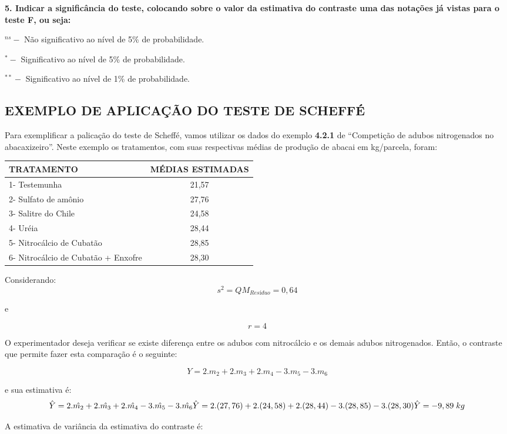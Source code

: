 \documentclass[
]{book}
\begin{document}
\textbf{5. Indicar a significância do teste, colocando sobre o valor da estimativa do contraste uma das notações já vistas para o teste F, ou seja:}

\(^{ns}-\) Não significativo ao nível de 5\% de probabilidade.

\(^{*}-\) Significativo ao nível de 5\% de probabilidade.

\(^{**}-\) Significativo ao nível de 1\% de probabilidade.

\hypertarget{exemplo-de-aplicauxe7uxe3o-do-teste-de-scheffuxe9}{%
\subsection{EXEMPLO DE APLICAÇÃO DO TESTE DE SCHEFFÉ}\label{exemplo-de-aplicauxe7uxe3o-do-teste-de-scheffuxe9}}

Para exemplificar a palicação do teste de Scheffé, vamos utilizar os dados do exemplo \textbf{4.2.1} de ``Competição de adubos nitrogenados no abacaxizeiro''. Neste exemplo os tratamentos, com suas respectivas médias de produção de abacai em kg/parcela, foram:

\begin{longtable}[]{@{}lc@{}}
\toprule
TRATAMENTO & MÉDIAS ESTIMADAS\tabularnewline
\midrule
\endhead
1- Testemunha & 21,57\tabularnewline
2- Sulfato de amônio & 27,76\tabularnewline
3- Salitre do Chile & 24,58\tabularnewline
4- Uréia & 28,44\tabularnewline
5- Nitrocálcio de Cubatão & 28,85\tabularnewline
6- Nitrocálcio de Cubatão + Enxofre & 28,30\tabularnewline
\bottomrule
\end{longtable}

Considerando:
\[
s^2 = QM_{Resíduo} = 0,64
\]

e

\[
r=4
\]

O experimentador deseja verificar se existe diferença entre os adubos com nitrocálcio e os demais adubos nitrogenados. Então, o contraste que permite fazer esta comparação é o seguinte:

\[
Y = 2.m_2 + 2.m_3 + 2.m_4 - 3.m_5 - 3.m_6
\]

e sua estimativa é:
\[
\hat{Y} = 2.\hat{m_2} + 2.\hat{m_3} + 2.\hat{m_4} - 3.\hat{m_5} - 3.\hat{m_6} \\
\hat{Y} = 2.(27,76) + 2.(24,58) + 2.(28,44) - 3.(28,85) - 3.(28,30) \\
\hat{Y} = -9,89\;kg
\]

A estimativa de variância da estimativa do contraste é:
\end{document}
